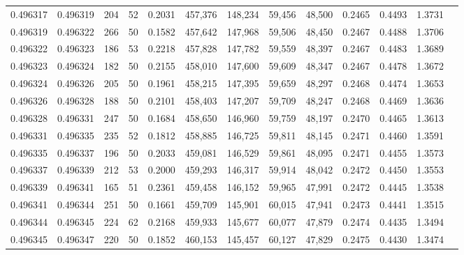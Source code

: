 \begin{tabular}{rrrrrrrrrrrrr}
0.496317 & 0.496319 &   204 &  52 &                                     0.2031 & 457,376 & 148,234 &  59,456 &  48,500 & 0.2465 & 0.4493 & 1.3731 \\
0.496319 & 0.496322 &   266 &  50 &                                     0.1582 & 457,642 & 147,968 &  59,506 &  48,450 & 0.2467 & 0.4488 & 1.3706 \\
0.496322 & 0.496323 &   186 &  53 &                                     0.2218 & 457,828 & 147,782 &  59,559 &  48,397 & 0.2467 & 0.4483 & 1.3689 \\
0.496323 & 0.496324 &   182 &  50 &                                     0.2155 & 458,010 & 147,600 &  59,609 &  48,347 & 0.2467 & 0.4478 & 1.3672 \\
0.496324 & 0.496326 &   205 &  50 &                                     0.1961 & 458,215 & 147,395 &  59,659 &  48,297 & 0.2468 & 0.4474 & 1.3653 \\
0.496326 & 0.496328 &   188 &  50 &                                     0.2101 & 458,403 & 147,207 &  59,709 &  48,247 & 0.2468 & 0.4469 & 1.3636 \\
0.496328 & 0.496331 &   247 &  50 &                                     0.1684 & 458,650 & 146,960 &  59,759 &  48,197 & 0.2470 & 0.4465 & 1.3613 \\
0.496331 & 0.496335 &   235 &  52 &                                     0.1812 & 458,885 & 146,725 &  59,811 &  48,145 & 0.2471 & 0.4460 & 1.3591 \\
0.496335 & 0.496337 &   196 &  50 &                                     0.2033 & 459,081 & 146,529 &  59,861 &  48,095 & 0.2471 & 0.4455 & 1.3573 \\
0.496337 & 0.496339 &   212 &  53 &                                     0.2000 & 459,293 & 146,317 &  59,914 &  48,042 & 0.2472 & 0.4450 & 1.3553 \\
0.496339 & 0.496341 &   165 &  51 &                                     0.2361 & 459,458 & 146,152 &  59,965 &  47,991 & 0.2472 & 0.4445 & 1.3538 \\
0.496341 & 0.496344 &   251 &  50 &                                     0.1661 & 459,709 & 145,901 &  60,015 &  47,941 & 0.2473 & 0.4441 & 1.3515 \\
0.496344 & 0.496345 &   224 &  62 &                                     0.2168 & 459,933 & 145,677 &  60,077 &  47,879 & 0.2474 & 0.4435 & 1.3494 \\
0.496345 & 0.496347 &   220 &  50 &                                     0.1852 & 460,153 & 145,457 &  60,127 &  47,829 & 0.2475 & 0.4430 & 1.3474 \\

\end{tabular}

